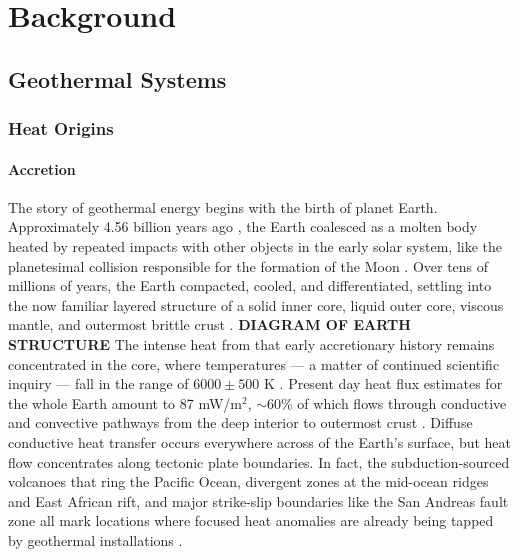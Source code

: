 \chapter{Background}\label{ch2:background}

\section{Geothermal Systems}\label{ch2:geosys}
\subsection{Heat Origins}\label{ch2:heatorig}
\subsubsection{Accretion}\label{ch2:accrete}
The story of geothermal energy begins with the birth of planet Earth. Approximately 4.56 billion years ago \citep{allegre_age_1995, patterson_age_1956}, the Earth coalesced as a molten body heated by repeated impacts with other objects in the early solar system, like the planetesimal collision responsible for the formation of the Moon \citep{stevenson_origin_2014}. Over tens of millions of years, the Earth compacted, cooled, and differentiated, settling into the now familiar layered structure of a solid inner core, liquid outer core, viscous mantle, and outermost brittle crust \citep[~p. 7]{press_understanding_2004}. \textbf{DIAGRAM OF EARTH STRUCTURE} The intense heat from that early accretionary history remains concentrated in the core, where temperatures --- a matter of continued scientific inquiry --- fall in the range of $6000\pm500$ K \citep[~p. 372]{fowler_solid_2005}. Present day heat flux estimates for the whole Earth amount to 87 mW/m$^2$, $\sim$60\% of which flows through conductive and convective pathways from the deep interior to outermost crust \citep{stein_heat_1995}. Diffuse conductive heat transfer occurs everywhere across of the Earth’s surface, but heat flow concentrates along tectonic plate boundaries. In fact, the subduction-sourced volcanoes that ring the Pacific Ocean, divergent zones at the mid-ocean ridges and East African rift, and major strike-slip boundaries like the San Andreas fault zone all mark locations where focused heat anomalies are already being tapped by geothermal installations \citep[~p. 16]{dipippo_geothermal_2012}.

